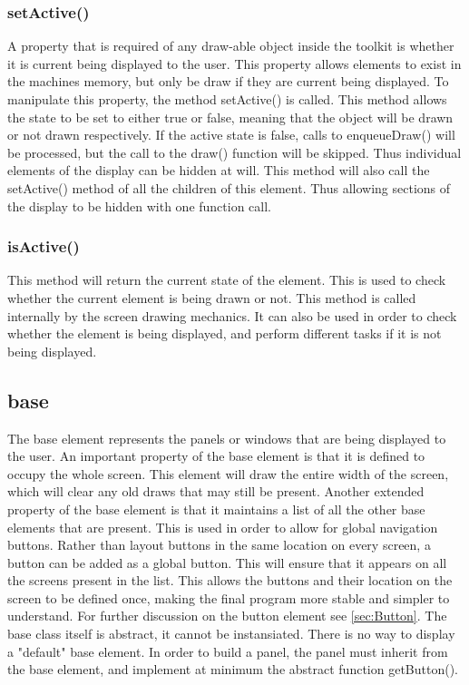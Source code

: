 
\subsubsection{setActive()}

A property that is required of any draw-able object inside the toolkit is whether it is current being displayed to the user. This property allows elements to exist in the machines memory, but only be draw if they are current being displayed. To manipulate this property, the method setActive() is called. This method allows the state to be set to either true or false, meaning that the object will be drawn or not drawn respectively. If the active state is false, calls to enqueueDraw() will be processed, but the call to the draw() function will be skipped. Thus individual elements of the display can be hidden at will. This method will also call the setActive() method of all the children of this element. Thus allowing sections of the display to be hidden with one function call.

\subsubsection{isActive()}

This method will return the current state of the element. This is used to check whether the current element is being drawn or not. This method is called internally by the screen drawing mechanics. It can also be used in order to check whether the element is being displayed, and perform different tasks if it is not being displayed.

\subsection{base}

The base element represents the panels or windows that are being displayed to the user. An important property of the base element is that it is defined to occupy the whole screen. This element will draw the entire width of the screen, which will clear any old draws that may still be present. Another extended property of the base element is that it maintains a list of all the other base elements that are present. This is used in order to allow for global navigation buttons. Rather than layout buttons in the same location on every screen, a button can be added as a global button. This will ensure that it appears on all the screens present in the list. This allows the buttons and their location on the screen to be defined once, making the final program more stable and simpler to understand.
For further discussion on the button element see \ref{sec:Button}.
The base class itself is abstract, it cannot be instansiated. There is no way to display a "default" base element. In order to build a panel, the panel must inherit from the base element, and implement at minimum the abstract function getButton().

